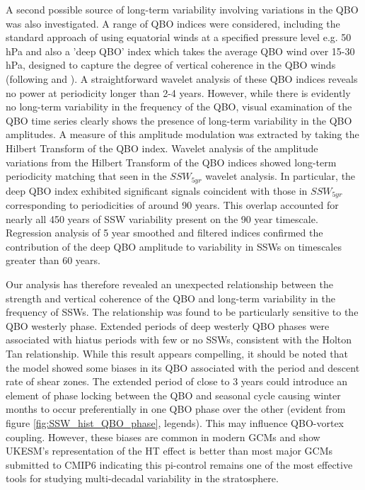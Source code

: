 A second possible source of long-term variability involving variations in the QBO was also investigated. A range of QBO indices were considered, including the standard approach of using equatorial winds at a specified pressure level e.g. 50 hPa and also a 'deep QBO' index which takes the average QBO wind over 15-30 hPa, designed to capture the degree of vertical coherence in the QBO winds (following \cite{graySurface2018} and \cite{andrewsObserved2019}). A straightforward wavelet analysis of these QBO indices reveals no power at periodicity longer than 2-4 years. However, while there is evidently no long-term variability in the frequency of the QBO, visual examination of the QBO time series clearly shows the presence of long-term variability in the QBO amplitudes. A measure of this amplitude modulation was extracted by taking the Hilbert Transform of the QBO index. Wavelet analysis of the amplitude variations from the Hilbert Transform of the QBO indices showed long-term periodicity matching that seen in the $SSW_{5yr}$ wavelet analysis. In particular, the deep QBO index exhibited significant signals coincident with those in $SSW_{5yr}$ corresponding to periodicities of around 90 years. This overlap accounted for nearly all 450 years of SSW variability present on the 90 year timescale. Regression analysis of 5 year smoothed and filtered indices confirmed the contribution of the deep QBO amplitude to variability in SSWs on timescales greater than 60 years. 

Our analysis has therefore revealed an unexpected relationship between the strength and vertical coherence of the QBO and long-term variability in the frequency of SSWs. The relationship was found to be particularly sensitive to the QBO westerly phase. Extended periods of deep westerly QBO phases were associated with hiatus periods with few or no SSWs, consistent with the Holton Tan relationship. While this result appears compelling, it should be noted that the model showed some biases in its QBO associated with the period and descent rate of shear zones. The extended period of close to 3 years could introduce an element of phase locking between the QBO and seasonal cycle causing winter months to occur preferentially in one QBO phase over the other (evident from figure \ref{fig:SSW_hist_QBO_phase}, legends). This may influence QBO-vortex coupling. However, these biases are common in modern GCMs \citep{bushellEvaluation2020} and \cite{raoModulation2019} show UKESM's representation of the HT effect is better than most major GCMs submitted to CMIP6 indicating this pi-control remains one of the most effective tools for studying multi-decadal variability in the stratosphere.

